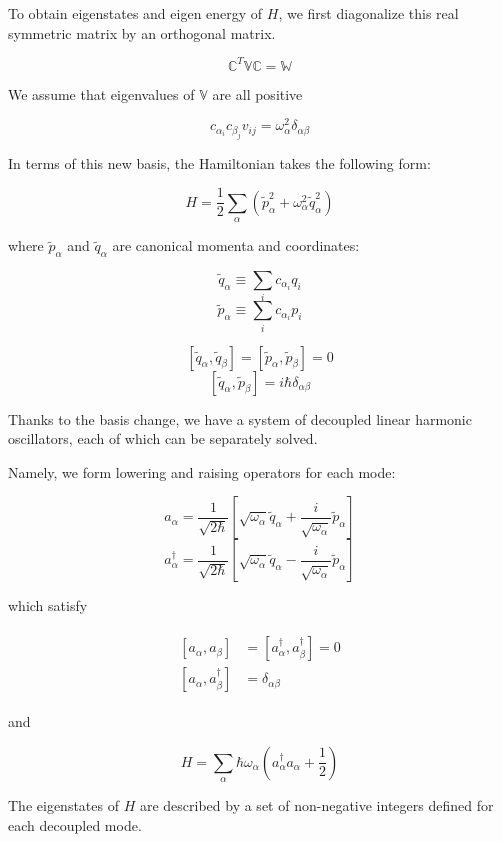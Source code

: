 To obtain eigenstates and eigen energy of $H$, we first diagonalize this real symmetric matrix by an orthogonal matrix. 

\[\mathbb{C}^T \mathbb{V}\mathbb{C} = \mathbb{W} \]

We assume that eigenvalues of $\mathbb{V}$ are all positive

\[c_{\alpha_i}c_{\beta_j}v_{ij} = \omega_{\alpha}^2\delta_{\alpha\beta} \]

In terms of this new basis, the Hamiltonian takes the following form:

\[H = \frac{1}{2}\sum_{\alpha}(\tilde{p}_{\alpha}^2+\omega_{\alpha}^2\tilde{q}_{\alpha}^2) \]

where $\tilde{p}_{\alpha}$ and $\tilde{q}_{\alpha}$ are canonical momenta and coordinates:

\[\tilde{q}_{\alpha}\equiv \sum_i c_{\alpha_i}q_i \]
\[\tilde{p}_{\alpha}\equiv \sum_i c_{\alpha_i}p_i \]

\[[\tilde{q}_{\alpha},\tilde{q}_{\beta}] = [\tilde{p}_{\alpha},\tilde{p}_{\beta}] = 0 \]
\[[\tilde{q}_{\alpha},\tilde{p}_{\beta}] = i\hbar\delta_{\alpha\beta} \]

Thanks to the basis change, we have a system of decoupled linear harmonic oscillators, each of which can be separately solved. 

Namely, we form lowering and raising operators for each mode:

\[a_{\alpha} = \frac{1}{\sqrt{2\hbar}}\left[\sqrt{\omega_{\alpha}}\tilde{q}_{\alpha}+\frac{i}{\sqrt{\omega_{\alpha}}}\tilde{p}_{\alpha}\right] \]
\[a_{\alpha}^\dagger = \frac{1}{\sqrt{2\hbar}}\left[\sqrt{\omega_{\alpha}}\tilde{q}_{\alpha}-\frac{i}{\sqrt{\omega_{\alpha}}}\tilde{p}_{\alpha}\right] \]

which satisfy

\begin{align}\label{Eqs1.3.2}
\begin{split}
[a_{\alpha},a_{\beta}] & = [a_\alpha^\dagger, a_\beta^\dagger] = 0\\
[a_\alpha,a_\beta^\dagger] &= \delta_{\alpha\beta}
\end{split}
\end{align}

and

\[H = \sum_\alpha \hbar\omega_\alpha(a^\dagger_\alpha a_\alpha + \frac{1}{2}) \]

The eigenstates of $H$ are described by a set of non-negative integers defined for each decoupled mode. 

